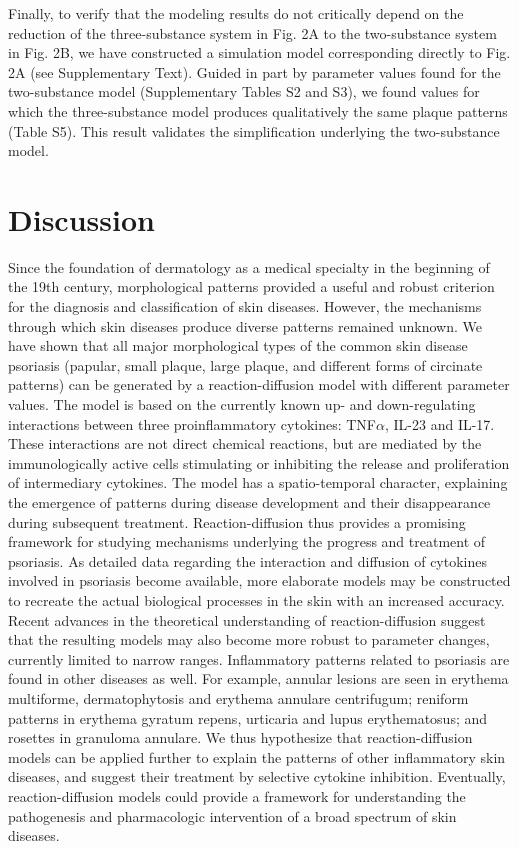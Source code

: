 Finally, to verify that the modeling results do not critically depend on the reduction of the three-substance system in Fig. 2A to the two-substance system in Fig. 2B, we have constructed a simulation model corresponding directly to Fig. 2A (see Supplementary Text). Guided in part by parameter values found for the two-substance model (Supplementary Tables S2 and S3), we found values for which the three-substance model produces qualitatively the same plaque patterns (Table S5). This result validates the simplification underlying the two-substance model.

\section{Discussion}
Since the foundation of dermatology as a medical specialty in the beginning of the 19th century, morphological patterns provided a useful and robust criterion for the diagnosis and classification of skin diseases. However, the mechanisms through which skin diseases produce diverse patterns remained unknown. We have shown that all major morphological types of the common skin disease psoriasis (papular, small plaque, large plaque, and different forms of circinate patterns) can be generated by a reaction-diffusion model with different parameter values. The model is based on the currently known up- and down-regulating interactions between three proinflammatory cytokines: TNF$\alpha$, IL-23 and IL-17. These interactions are not direct chemical reactions, but are mediated by the immunologically active cells stimulating or inhibiting the release and proliferation of intermediary cytokines. The model has a spatio-temporal character, explaining the emergence of patterns during disease development and their disappearance during subsequent treatment. Reaction-diffusion thus provides a promising framework for studying mechanisms underlying the progress and treatment of psoriasis. As detailed data regarding the interaction and diffusion of cytokines involved in psoriasis become available, more elaborate models may be constructed to recreate the actual biological processes in the skin with an increased accuracy. Recent advances in the theoretical understanding of reaction-diffusion \citep{diego2018} suggest that the resulting models may also become more robust to parameter changes, currently limited to narrow ranges. Inflammatory patterns related to psoriasis are found in other diseases as well. For example, annular lesions are seen in erythema multiforme, dermatophytosis and erythema annulare centrifugum; reniform patterns in erythema gyratum repens, urticaria and lupus erythematosus; and rosettes in granuloma annulare. We thus hypothesize that reaction-diffusion models can be applied further to explain the patterns of other inflammatory skin diseases, and suggest their treatment by selective cytokine inhibition. Eventually, reaction-diffusion models could provide a framework for understanding the pathogenesis and pharmacologic intervention of a broad spectrum of skin diseases. 

